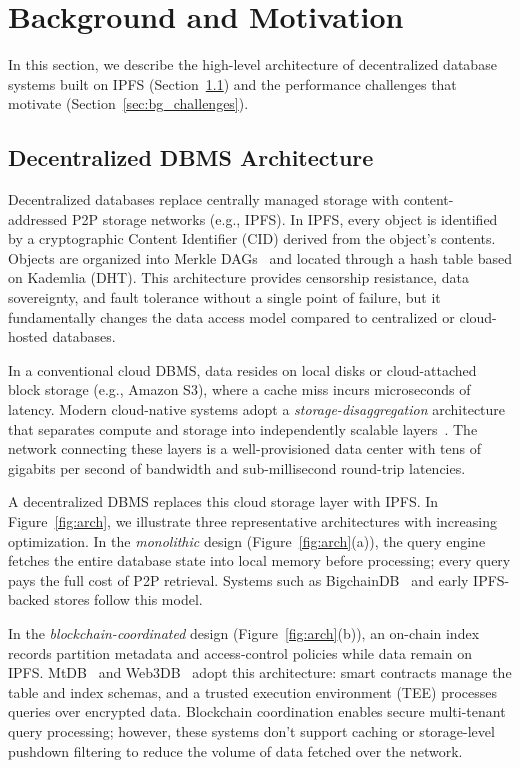 \section{Background and Motivation}
 
In this section, we describe the high-level architecture of decentralized database systems built on IPFS (Section~\ref{sec:bg_arch}) and the performance challenges that motivate \ours (Section~\ref{sec:bg_challenges}).
 
\subsection{Decentralized DBMS Architecture}
\label{sec:bg_arch}
 
Decentralized databases replace centrally managed storage with content-addressed P2P storage networks (e.g., IPFS). In IPFS, every object is identified by a cryptographic Content Identifier (CID) derived from the object's contents. Objects are organized into Merkle DAGs~\cite{merkle1987digital} and located through a hash table based on Kademlia (DHT)\cite{daniel2022ipfs, trautwein2022design}. This architecture provides censorship resistance, data sovereignty, and fault tolerance without a single point of failure, but it fundamentally changes the data access model compared to centralized or cloud-hosted databases.
 
In a conventional cloud DBMS, data resides on local disks or cloud-attached block storage (e.g., Amazon S3), where a cache miss incurs microseconds of latency. Modern cloud-native systems adopt a \emph{storage-disaggregation} architecture that separates compute and storage into independently scalable layers~\cite{dageville2016snowflake, yang2021flexpushdowndb}. The network connecting these layers is a well-provisioned data center with tens of gigabits per second of bandwidth and sub-millisecond round-trip latencies.
 
A decentralized DBMS replaces this cloud storage layer with IPFS. In Figure~\ref{fig:arch}, we illustrate three representative architectures with increasing optimization. In the \emph{monolithic} design (Figure~\ref{fig:arch}(a)), the query engine fetches the entire database state into local memory before processing; every query pays the full cost of P2P retrieval. Systems such as BigchainDB~\cite{mcconaghy2016bigchaindb} and early IPFS-backed stores follow this model.
 
In the \emph{blockchain-coordinated} design (Figure~\ref{fig:arch}(b)), an on-chain index records partition metadata and access-control policies while data remain on IPFS. MtDB~\cite{hossain2025mtdb} and Web3DB~\cite{mukherjee2025web3db} adopt this architecture: smart contracts manage the table and index schemas, and a trusted execution environment (TEE\cite{}) processes queries over encrypted data. Blockchain coordination enables secure multi-tenant query processing; however, these systems don't support caching or storage-level pushdown filtering to reduce the volume of data fetched over the network.
 
